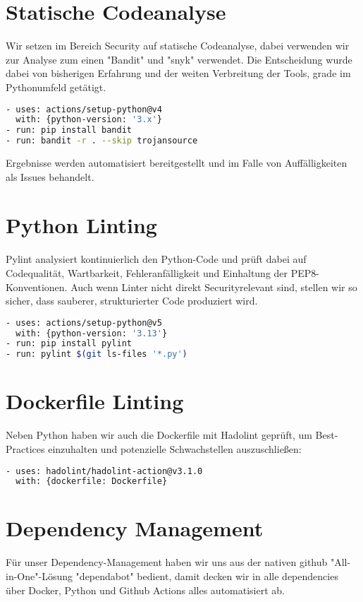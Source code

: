\documentclass[12pt, a4paper]{scrreprt}
\begin{document}
\section{Statische Codeanalyse}
Wir setzen im Bereich Security auf statische Codeanalyse, dabei verwenden wir zur Analyse zum einen "Bandit" und "snyk" verwendet. Die Entscheidung wurde dabei von bisherigen Erfahrung und der weiten Verbreitung der Tools, grade im Pythonumfeld getätigt.

\begin{lstlisting}[language=Bash, caption=Bandit via GitHub Actions]
- uses: actions/setup-python@v4
  with: {python-version: '3.x'}
- run: pip install bandit
- run: bandit -r . --skip trojansource
\end{lstlisting}

Ergebnisse werden automatisiert bereitgestellt und im Falle von Auffälligkeiten als Issues behandelt.

\section{Python Linting}
Pylint analysiert kontinuierlich den Python-Code und prüft dabei auf Codequalität, Wartbarkeit, Fehleranfälligkeit und Einhaltung der PEP8-Konventionen. Auch wenn Linter nicht direkt Securityrelevant sind, stellen wir so sicher, dass sauberer, strukturierter Code produziert wird.

\begin{lstlisting}[language=Bash, caption=Pylint Integration]
- uses: actions/setup-python@v5
  with: {python-version: '3.13'}
- run: pip install pylint
- run: pylint $(git ls-files '*.py')
\end{lstlisting}

\section{Dockerfile Linting}
Neben Python haben wir auch die Dockerfile mit Hadolint geprüft, um Best-Practices einzuhalten und potenzielle Schwachstellen auszuschließen:

\begin{lstlisting}[language=Bash, caption=Hadolint Action für Dockerfile]
- uses: hadolint/hadolint-action@v3.1.0
  with: {dockerfile: Dockerfile}
\end{lstlisting}

\newpage

\section{Dependency Management}
Für unser Dependency-Management haben wir uns aus der nativen github "All-in-One"-Lösung "dependabot" bedient, damit decken wir in alle dependencies über Docker, Python und Github Actions alles automatisiert ab.
\end{document}
